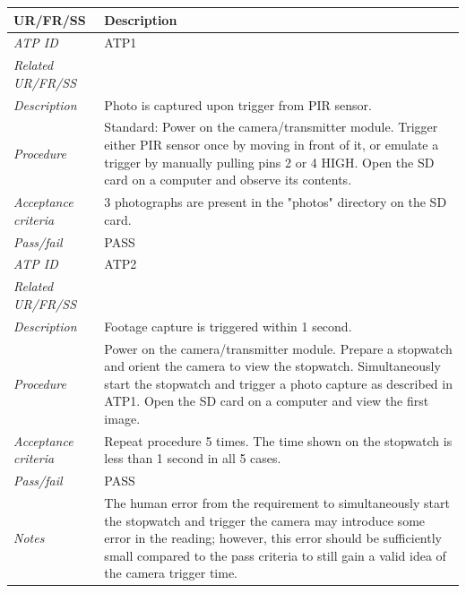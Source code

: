 \begin{table}[!ht]
    \centering
    \begin{scriptsize}
    \begin{tabularx}{\textwidth}{|p{} X|}
        
        \hline
        \textbf{UR/FR/SS} & \textbf{Description}\\ \hline
        \textit{ATP ID} & ATP1\\
        \textit{Related UR/FR/SS} &\\
        \textit{Description} & Photo is captured upon trigger from PIR sensor.\\
        \textit{Procedure} & Standard: Power on the camera/transmitter module. Trigger either PIR sensor once by moving in front of it, or emulate a trigger by manually pulling pins 2 or 4 HIGH. Open the SD card on a computer and observe its contents.\\
        \textit{Acceptance criteria} & 3 photographs are present in the "photos" directory on the SD card.\\ 
        \textit{Pass/fail} & PASS \\ \hline

        \textit{ATP ID} & ATP2 \\
        \textit{Related UR/FR/SS} & \\
        \textit{Description} & Footage capture is triggered within 1 second.\\
        \textit{Procedure} & Power on the camera/transmitter module. Prepare a stopwatch and orient the camera to view the stopwatch. Simultaneously start the stopwatch and trigger a photo capture as described in ATP1. Open the SD card on a computer and view the first image.\\
        \textit{Acceptance criteria} & Repeat procedure 5 times. The time shown on the stopwatch is less than 1 second in all 5 cases.\\ 
        \textit{Pass/fail} & PASS\\
        \textit{Notes} & The human error from the requirement to simultaneously start the stopwatch and trigger the camera may introduce some error in the reading; however, this error should be sufficiently small compared to the pass criteria to still gain a valid idea of the camera trigger time. \\ \hline


\end{tabularx}
\end{scriptsize}
\end{table}
